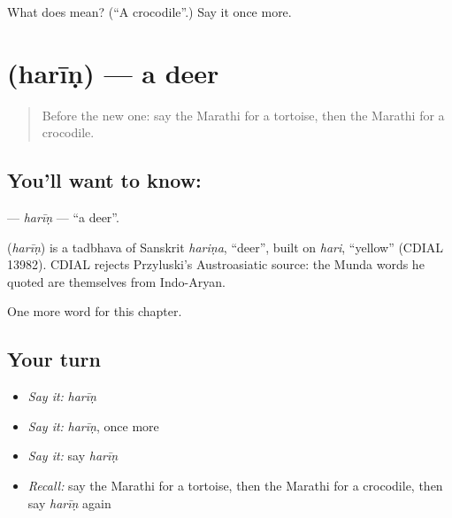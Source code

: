 \begin{tcolorbox}[breakable,colback=teal!4,colframe=teal!35!black,title={Before you move on}]
What does  mean? (\textquotedblleft{}A crocodile\textquotedblright{}.) Say it once more.
\end{tcolorbox}
\section[\texorpdfstring{\mr{हरीण} (harīṇ)}{हरीण (harīṇ)}]{ (harīṇ) — a deer}

\label{lesson:MR-C143-harin}



\begin{quote}
Before the new one: say the Marathi for a tortoise, then the Marathi for a crocodile.
\end{quote}

\subsection*{You'll want to know: }
\textbf{} — \emph{harīṇ} — \textquotedblleft{}a deer\textquotedblright{}.

\begin{cousinweb}
\textbf{} (\emph{harīṇ}) is a tadbhava of Sanskrit \emph{hariṇa}, \textquotedblleft{}deer\textquotedblright{}, built on \emph{hari}, \textquotedblleft{}yellow\textquotedblright{} (CDIAL 13982). CDIAL rejects Przyluski's Austroasiatic source: the Munda words he quoted are themselves from Indo-Aryan.
\end{cousinweb}

\begin{grammarlens}[title={What you've built}]
One more word for this chapter.
\end{grammarlens}

\subsection*{Your turn}
\begin{itemize}
\raggedright
  \item \emph{Say it:} \emph{harīṇ}
  \item \emph{Say it:} \emph{harīṇ}, once more
  \item \emph{Say it:} say \emph{harīṇ}
  \item \emph{Recall:} say the Marathi for a tortoise, then the Marathi for a crocodile, then say \emph{harīṇ} again
\end{itemize}

